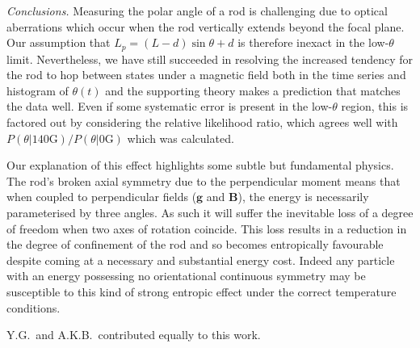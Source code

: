 \documentclass[aps,prl,twocolumn,superscriptaddress]{revtex4-1}
\newcommand{\vcrm}[1]{\mathbf{#1}}
\newcommand{\hvcrm}[1]{\mathbf{\hat{#1}}}
\newcommand{\vc}[1]{\boldsymbol{#1}}
\newcommand{\hvc}[1]{\boldsymbol{\hat{#1}}}
\newcommand{\kk}{\mathrm{k}_B}
\begin{document}
%
%
%
%
%
%
%
\emph{Conclusions.} Measuring the polar angle of a rod is challenging due to optical aberrations which occur when the rod vertically extends beyond the focal plane. Our assumption that $L_p=(L-d)\sin\theta + d$ is therefore inexact in the low-$\theta$ limit. Nevertheless, we have still succeeded in resolving the increased tendency for the rod to hop between states under a magnetic field both in the time series and histogram of $\theta(t)$ and the supporting theory makes a prediction that matches the data well. Even if some systematic error is present in the low-$\theta$ region, this is factored out by considering the relative likelihood ratio, which agrees well with $P(\theta|140 \text{G})/P(\theta|0 \text{G})$ which was calculated.

Our explanation of this effect highlights some subtle but fundamental physics. The rod's broken axial symmetry due to the perpendicular moment means that when coupled to perpendicular fields ($\vcrm{g}$ and $\vcrm{B}$), the energy is necessarily parameterised by three angles. As such it will suffer the inevitable loss of a degree of freedom when two axes of rotation coincide. This loss results in a reduction in the degree of confinement of the rod and so becomes entropically favourable despite coming at a necessary and substantial energy cost.  Indeed any particle with an energy possessing no orientational continuous symmetry may be susceptible to this kind of strong entropic effect under the correct temperature conditions.
  
Y.G.\ and A.K.B.\ contributed equally to this work.

\end{document}
